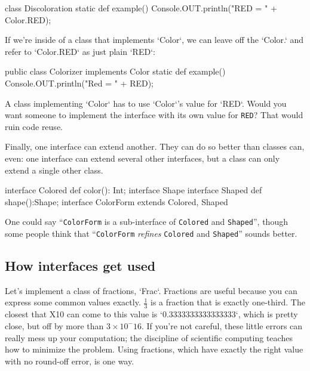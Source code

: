 \begin{description}
\begin{xtennum}[]
class Discoloration {
  static def example() {
    Console.OUT.println("RED = " + Color.RED);
  }
}
\end{xtennum}

If we're inside of a class that implements \xcd`Color`, we can leave off the
\xcd`Color.` and refer to \xcd`Color.RED` as just plain \xcd`RED`:

\begin{xtennum}[]
public class Colorizer implements Color {
   static def example() {
      Console.OUT.println("Red = " + RED); 
   }
}
\end{xtennum}

A class implementing \xcd`Color` has to use \xcd`Color`'s value for \xcd`RED`.  
Would you 
want someone to implement the interface with its own value for {\tt RED}? That
would ruin code reuse. 


\end{description}

Finally, one interface can extend another. They can do so better than classes
can, even: one interface can extend several other interfaces, but a class can
only extend a single other class. 

\begin{xtennum}[]
interface Colored {
  def color(): Int;
}
interface Shape{}
interface Shaped {
  def shape():Shape;
}
interface ColorForm extends Colored, Shaped {}
\end{xtennum}


One could
say ``{\tt ColorForm} is a sub-interface of {\tt Colored} and {\tt Shaped}'', though some
people think that 
``{\tt ColorForm} {\em refines} {\tt Colored} and {\tt Shaped}'' sounds better. 

\subsection{How interfaces get used}

Let's implement a class of fractions, \xcd`Frac`.  Fractions are useful
because you can express some common values exactly.  {$\frac{1}{3}$} is a
fraction that is exactly one-third.  The 
closest that X10 can come to this value is 
\xcd`0.3333333333333333`, which is pretty close, but off by more than
{$3\times 10^-16$}.  If you're not careful, these little errors can really
mess up your computation; the discipline of scientific computing teaches how
to minimize the problem.  Using fractions, which have exactly the right value
with no round-off error, is one way.

